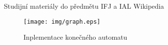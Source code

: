 \documentclass[12pt,a4paper,titlepage,final]{article}
\begin{document}


\begin{thebibliography}{2}
Studijní materiály do předmětu IFJ a IAL
Wikipedia

\end{thebibliography}

\newpage
\begin{figure}[p]
  \centering
  \texttt{[image: img/graph.eps]}
  \caption{Inplementace konečného automatu}
  \label{konecny automat}
\end{figure}
\end{document}

